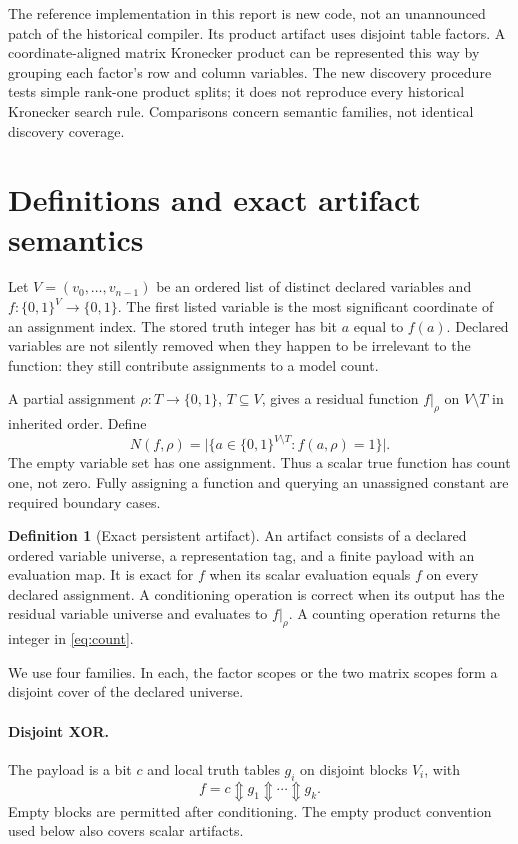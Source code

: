 \documentclass[11pt]{article}
\newcommand{\B}{\{0,1\}}
\newcommand{\xor}{\mathbin{\Updownarrow}}
\theoremstyle{definition}\newtheorem{definition}[theorem]{Definition}
\theoremstyle{remark}\newtheorem{remark}[theorem]{Remark}
\begin{document}
The reference implementation in this report is new code, not an unannounced patch of the historical compiler. Its product artifact uses disjoint table factors. A coordinate-aligned matrix Kronecker product can be represented this way by grouping each factor's row and column variables. The new discovery procedure tests simple rank-one product splits; it does not reproduce every historical Kronecker search rule. Comparisons concern semantic families, not identical discovery coverage.

\section{Definitions and exact artifact semantics}
\label{sec:definitions}
Let $V=(v_0,\ldots,v_{n-1})$ be an ordered list of distinct declared variables and $f:\B^V\to\B$. The first listed variable is the most significant coordinate of an assignment index. The stored truth integer has bit $a$ equal to $f(a)$. Declared variables are not silently removed when they happen to be irrelevant to the function: they still contribute assignments to a model count.

A partial assignment $\rho:T\to\B$, $T\subseteq V$, gives a residual function $f|_\rho$ on $V\setminus T$ in inherited order. Define
\begin{equation}
 N(f,\rho)=\bigl|\{a\in\B^{V\setminus T}:f(a,\rho)=1\}\bigr|.
 \label{eq:count}
\end{equation}
The empty variable set has one assignment. Thus a scalar true function has count one, not zero. Fully assigning a function and querying an unassigned constant are required boundary cases.

\begin{definition}[Exact persistent artifact]
An artifact consists of a declared ordered variable universe, a representation tag, and a finite payload with an evaluation map. It is exact for $f$ when its scalar evaluation equals $f$ on every declared assignment. A conditioning operation is correct when its output has the residual variable universe and evaluates to $f|_\rho$. A counting operation returns the integer in \eqref{eq:count}.
\end{definition}

We use four families. In each, the factor scopes or the two matrix scopes form a disjoint cover of the declared universe.

\paragraph{Disjoint XOR.}
The payload is a bit $c$ and local truth tables $g_i$ on disjoint blocks $V_i$, with
\begin{equation}
 f=c\xor g_1\xor\cdots\xor g_k.
 \label{eq:xor}
\end{equation}
Empty blocks are permitted after conditioning. The empty product convention used below also covers scalar artifacts.
\end{document}

